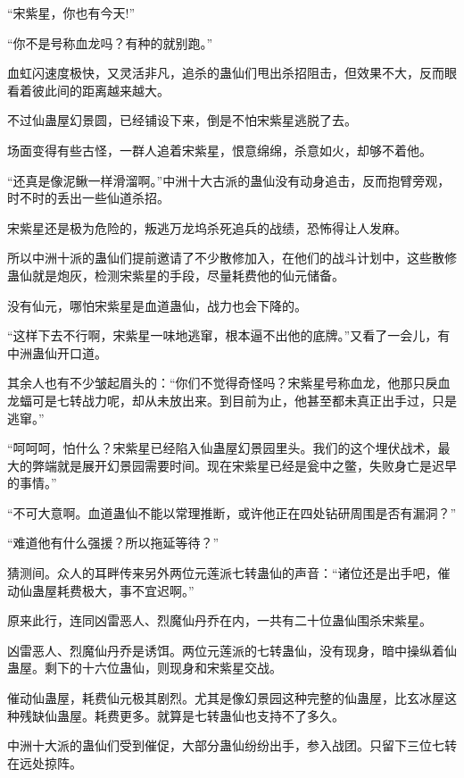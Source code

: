 
\begin{this_body}



“宋紫星，你也有今天!”

“你不是号称血龙吗？有种的就别跑。”

血虹闪速度极快，又灵活非凡，追杀的蛊仙们甩出杀招阻击，但效果不大，反而眼看着彼此间的距离越来越大。

不过仙蛊屋幻景圆，已经铺设下来，倒是不怕宋紫星逃脱了去。

场面变得有些古怪，一群人追着宋紫星，恨意绵绵，杀意如火，却够不着他。

“还真是像泥鳅一样滑溜啊。”中洲十大古派的蛊仙没有动身追击，反而抱臂旁观，时不时的丢出一些仙道杀招。

宋紫星还是极为危险的，叛逃万龙坞杀死追兵的战绩，恐怖得让人发麻。

所以中洲十派的蛊仙们提前邀请了不少散修加入，在他们的战斗计划中，这些散修蛊仙就是炮灰，检测宋紫星的手段，尽量耗费他的仙元储备。

没有仙元，哪怕宋紫星是血道蛊仙，战力也会下降的。

“这样下去不行啊，宋紫星一味地逃窜，根本逼不出他的底牌。”又看了一会儿，有中洲蛊仙开口道。

其余人也有不少皱起眉头的：“你们不觉得奇怪吗？宋紫星号称血龙，他那只戾血龙蝠可是七转战力呢，却从未放出来。到目前为止，他甚至都未真正出手过，只是逃窜。”

“呵呵呵，怕什么？宋紫星已经陷入仙蛊屋幻景园里头。我们的这个埋伏战术，最大的弊端就是展开幻景园需要时间。现在宋紫星已经是瓮中之鳖，失败身亡是迟早的事情。”

“不可大意啊。血道蛊仙不能以常理推断，或许他正在四处钻研周围是否有漏洞？”

“难道他有什么强援？所以拖延等待？”

猜测间。众人的耳畔传来另外两位元莲派七转蛊仙的声音：“诸位还是出手吧，催动仙蛊屋耗费极大，事不宜迟啊。”

原来此行，连同凶雷恶人、烈魔仙丹乔在内，一共有二十位蛊仙围杀宋紫星。

凶雷恶人、烈魔仙丹乔是诱饵。两位元莲派的七转蛊仙，没有现身，暗中操纵着仙蛊屋。剩下的十六位蛊仙，则现身和宋紫星交战。

催动仙蛊屋，耗费仙元极其剧烈。尤其是像幻景园这种完整的仙蛊屋，比玄冰屋这种残缺仙蛊屋。耗费更多。就算是七转蛊仙也支持不了多久。

中洲十大派的蛊仙们受到催促，大部分蛊仙纷纷出手，参入战团。只留下三位七转在远处掠阵。


\end{this_body}
